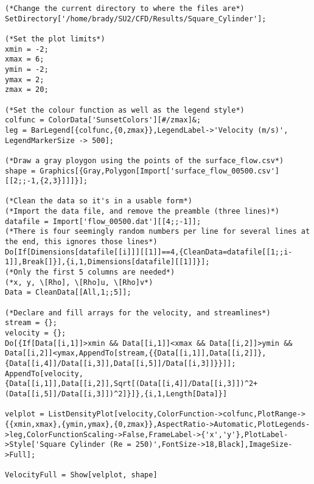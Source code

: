 \documentclass[10pt]{article}
\begin{document}
\begin{lstlisting}[breaklines=true, label=code, caption={This is my caption.}]
(*Change the current directory to where the files are*)
SetDirectory['/home/brady/SU2/CFD/Results/Square_Cylinder'];

(*Set the plot limits*)
xmin = -2;
xmax = 6;
ymin = -2;
ymax = 2;
zmax = 20;

(*Set the colour function as well as the legend style*)
colfunc = ColorData['SunsetColors'][#/zmax]&;
leg = BarLegend[{colfunc,{0,zmax}},LegendLabel->'Velocity (m/s)', LegendMarkerSize -> 500];

(*Draw a gray ploygon using the points of the surface_flow.csv*)
shape = Graphics[{Gray,Polygon[Import['surface_flow_00500.csv'][[2;;-1,{2,3}]]]}];

(*Clean the data so it's in a usable form*)
(*Import the data file, and remove the preamble (three lines)*)
datafile = Import['flow_00500.dat'][[4;;-1]];
(*There is four seemingly random numbers per line for several lines at the end, this ignores those lines*)
Do[If[Dimensions[datafile[[i]]][[1]]==4,{CleanData=datafile[[1;;i-1]],Break[]}],{i,1,Dimensions[datafile][[1]]}];
(*Only the first 5 columns are needed*)
(*x, y, \[Rho], \[Rho]u, \[Rho]v*)
Data = CleanData[[All,1;;5]];

(*Declare and fill arrays for the velocity, and streamlines*)
stream = {};
velocity = {};
Do[{If[Data[[i,1]]>xmin && Data[[i,1]]<xmax && Data[[i,2]]>ymin && Data[[i,2]]<ymax,AppendTo[stream,{{Data[[i,1]],Data[[i,2]]},{Data[[i,4]]/Data[[i,3]],Data[[i,5]]/Data[[i,3]]}}]];
AppendTo[velocity,{Data[[i,1]],Data[[i,2]],Sqrt[(Data[[i,4]]/Data[[i,3]])^2+(Data[[i,5]]/Data[[i,3]])^2]}]},{i,1,Length[Data]}]

velplot = ListDensityPlot[velocity,ColorFunction->colfunc,PlotRange->{{xmin,xmax},{ymin,ymax},{0,zmax}},AspectRatio->Automatic,PlotLegends->leg,ColorFunctionScaling->False,FrameLabel->{'x','y'},PlotLabel->Style['Square Cylinder (Re = 250)',FontSize->18,Black],ImageSize->Full];

VelocityFull = Show[velplot, shape]

\end{lstlisting}
\end{document}
